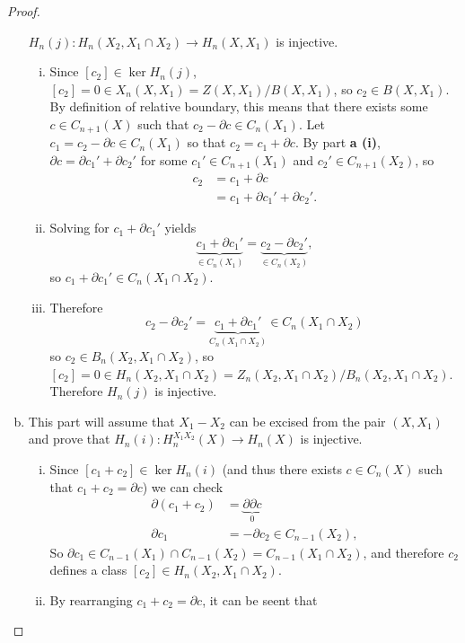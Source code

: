 \documentclass{article}
\newcommand{\fn}[3]{#1 \colon #2 \rightarrow #3}
\begin{document}
\begin{proof}
\begin{enumerate}[a.]
    $\fn{H_n(j)}{H_n(X_2,X_1 \cap X_2)}{H_n(X, X_1)}$ is injective.
    \begin{enumerate}[(i)]
      \item Since $[c_2] \in \ker H_n(j)$,
      $[c_2] = 0 \in X_n(X, X_1) = Z(X, X_1)/B(X, X_1)$, so
      $c_2 \in B(X, X_1)$. By definition of relative boundary, this means that
      there exists some $c \in C_{n+1}(X)$ such that
      $c_2 - \partial c \in C_n(X_1)$. Let $c_1 = c_2 - \partial c \in C_n(X_1)$
      so that $c_2 = c_1 + \partial c$. By part \textbf{a (i)},
      $\partial c = \partial c_1' + \partial c_2'$ for some
      $c_1' \in C_{n+1}(X_1)$ and $c_2' \in C_{n+1}(X_2)$, so \begin{align*}
        c_2 &= c_1 + \partial c \\
        &= c_1 + \partial c_1' + \partial c_2'.
      \end{align*}
      \item Solving for $c_1 + \partial c_1'$ yields \[
        \underbrace{c_1 + \partial c_1'}_{\in C_n(X_1)} = \underbrace{c_2 - \partial c_2'}_{\in C_n(X_2)},
      \] so $c_1 + \partial c_1' \in C_n(X_1 \cap X_2)$.
      \item Therefore \[
        c_2 - \partial c_2' = \underbrace{
          c_1 + \partial c_1'
        }_{C_n(X_1 \cap X_2)} \in C_n(X_1 \cap X_2)
      \] so $c_2 \in B_n(X_2, X_1 \cap X_2)$, so
      $[c_2] = 0 \in H_n(X_2, X_1 \cap X_2) = Z_n(X_2, X_1 \cap X_2)/B_n(X_2, X_1 \cap X_2)$.
      Therefore $H_n(j)$ is injective.
    \end{enumerate}
    \item This part will assume that $X_1 - X_2$ can be excised from the pair
    $(X, X_1)$ and prove that $\fn{H_n(i)}{H_n^{X_1X_2}(X)}{H_n(X)}$ is injective.
    \begin{enumerate}[(i)]
      \item Since $[c_1 + c_2] \in \ker H_n(i)$ (and thus there exists
      $c \in C_n(X)$ such that $c_1 + c_2 = \partial c$) we can check
      \begin{align*}
        \partial(c_1 + c_2) &= \underbrace{\partial \partial c}_0 \\
        \partial c_1 &= -\partial c_2 \in C_{n-1}(X_2),
      \end{align*}
      So $\partial c_1 \in C_{n-1}(X_1) \cap C_{n-1}(X_2) = C_{n-1}(X_1 \cap X_2)$,
      and therefore $c_2$ defines a class $[c_2] \in H_n(X_2, X_1 \cap X_2)$.
      \item By rearranging $c_1 + c_2 = \partial c$, it can be seent that

\end{enumerate}
\end{enumerate}
\end{proof}
\end{document}
